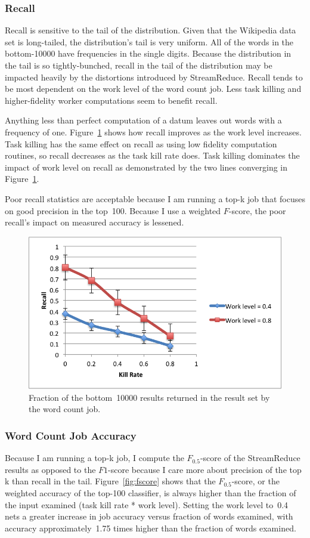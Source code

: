 \documentclass[12pt,twocolumn]{article}
\begin{document}
\subsubsection{Recall}
Recall is sensitive to the tail of the distribution. Given that the Wikipedia
data set is long-tailed, the distribution's tail is very uniform. All of the words
in the bottom-10000 have frequencies in the single digits. Because the distribution in the
tail is so tightly-bunched, recall in the tail of the distribution may be impacted heavily
by the distortions introduced by StreamReduce. Recall tends to be most dependent on the
work level of the word count job. Less task killing and higher-fidelity worker computations
seem to benefit recall.

Anything less than perfect computation of a datum leaves out words with a frequency of one.
Figure~\ref{fig:recall} shows how recall improves as the work level increases. Task killing has
the same effect on recall as using low fidelity computation routines, so recall decreases as
the task kill rate does. Task killing dominates the impact of work level on recall as
demonstrated by the two lines converging in Figure~\ref{fig:recall}.

Poor recall statistics are acceptable because I am running a top-k job that focuses
on good precision in the top~100. Because I use a weighted $F$-score, the poor recall's
impact on measured accuracy is lessened.

\begin{figure}
\includegraphics[width=\linewidth]{recall.png}
\caption{Fraction of the bottom~10000 results returned in the result set by the word count
job.}
\label{fig:recall}
\end{figure}


\subsubsection{Word Count Job Accuracy}
Because I am running a top-k job, I compute the $F_{0.5}$-score of the StreamReduce
results as
opposed to the $F1$-score because I care more about precision of the top k than recall
in the tail. Figure~\ref{fig:fscore} shows that the $F_{0.5}$-score, or the weighted
accuracy of the top-100 classifier, is always higher than the fraction of the input
examined (task kill rate * work level). Setting the work level to~0.4 nets a greater increase
in job accuracy versus fraction of words examined, with accuracy approximately~1.75 times
higher than the fraction of words examined.
\end{document}

